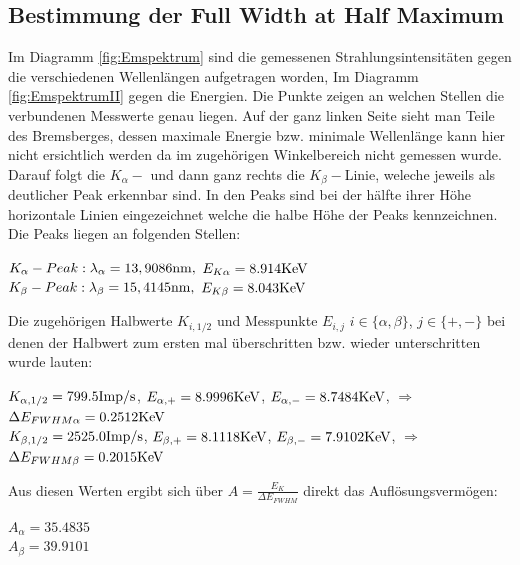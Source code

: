 \subsection{Bestimmung der Full Width at Half Maximum}
Im Diagramm \autoref{fig:Emspektrum} sind die gemessenen Strahlungsintensitäten gegen die 
verschiedenen Wellenlängen aufgetragen worden, Im Diagramm \autoref{fig:EmspektrumII} gegen die Energien.
Die Punkte zeigen an welchen Stellen die verbundenen Messwerte genau liegen. Auf der ganz linken Seite sieht man Teile des Bremsberges, dessen 
maximale Energie bzw. minimale Wellenlänge kann hier nicht ersichtlich werden da im zugehörigen Winkelbereich nicht 
gemessen wurde. Darauf folgt die $K_\alpha-$ und dann ganz rechts die $K_\beta-$Linie, weleche jeweils als deutlicher
Peak erkennbar sind. In den Peaks sind bei der hälfte ihrer Höhe horizontale Linien eingezeichnet welche die halbe
Höhe der Peaks kennzeichnen. Die Peaks liegen an folgenden Stellen:
\begin{center}
  $K_\alpha -Peak: \lambda_\alpha=13,9086\si[]{nm},$  $E_{K\alpha}=8.914\si[]{KeV}$\\
  $K_\beta -Peak:  \lambda_\beta=15,4145\si[]{nm},$  $E_{K\beta}=8.043\si[]{KeV}$
\end{center} 
Die zugehörigen Halbwerte $K_{i,1/2}$ und Messpunkte $E_{i,j}$ $i\in\{\alpha,\beta\}$, $j\in\{+,-\}$ bei denen 
der Halbwert zum ersten mal überschritten bzw. wieder unterschritten wurde lauten:
\begin{center}
  $K_{\alpha,1/2}=799.5\si[]{Imp/s}$, $E_{\alpha,+}=8.9996\si[]{KeV}$, $E_{\alpha,-}=8.7484\si[]{KeV}$, $\Rightarrow$ $\Delta E_{FWHM\alpha}=0.2512\si[]{KeV}$\\
  $K_{\beta,1/2}=2525.0\si[]{Imp/s}$, $E_{\beta,+}=8.1118\si[]{KeV}$, $E_{\beta,-}=7.9102\si[]{KeV}$, $\Rightarrow$ $\Delta E_{FWHM\beta}=0.2015\si[]{KeV}$
\end{center}
Aus diesen Werten ergibt sich über $A=\frac{E_K}{\Delta E_{FWHM}}$ direkt das Auflösungsvermögen:
\begin{center}
  $A_\alpha=35.4835$\\
  $A_\beta=39.9101$
\end{center}


